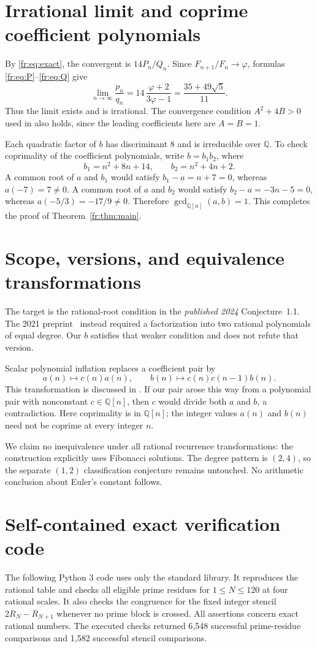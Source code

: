 \documentclass[11pt,a4paper]{article}
\newcommand{\Q}{\mathbb Q}
\theoremstyle{definition}
\theoremstyle{remark}
\numberwithin{equation}{section}
\begin{document}
\section{Irrational limit and coprime coefficient polynomials}

By \eqref{fr:eq:exact}, the convergent is $14P_n/Q_n$.
Since $F_{n+1}/F_n\to\varphi$, formulas
\eqref{fr:eq:P}--\eqref{fr:eq:Q} give
\[
 \lim_{n\to\infty}\frac{p_n}{q_n}
 =14\,\frac{\varphi+2}{3\varphi-1}
 =\frac{35+49\sqrt5}{11}.
\]
Thus the limit exists and is irrational. The convergence condition
$A^2+4B>0$ used in \cite{BND} also holds, since the leading
coefficients here are $A=B=1$.

Each quadratic factor of $b$ has discriminant $8$ and is
irreducible over $\Q$. To check coprimality of the coefficient polynomials, write
$b=b_1b_2$, where
\[
 b_1=n^2+8n+14,\qquad b_2=n^2+4n+2.
\]
A common root of $a$ and $b_1$ would satisfy
$b_1-a=n+7=0$, whereas $a(-7)=7\ne0$.
A common root of $a$ and $b_2$ would satisfy
$b_2-a=-3n-5=0$, whereas $a(-5/3)=-17/9\ne0$.
Therefore $\gcd_{\Q[n]}(a,b)=1$. This completes the proof of
Theorem~\ref{fr:thm:main}.

\section{Scope, versions, and equivalence transformations}
The target is the rational-root condition in the \emph{published 2024}
Conjecture~1.1. The 2021 preprint~\cite{BNDv1} instead required a
factorization into two rational polynomials of equal degree. Our
$b$ satisfies that weaker condition and does not refute that version.

Scalar polynomial inflation replaces a coefficient pair by
\[
 a(n)\longmapsto c(n)a(n),\qquad
 b(n)\longmapsto c(n)c(n-1)b(n).
\]
This transformation is discussed in \cite[Appendix~C]{BND}.
If our pair arose this way from a polynomial pair with nonconstant
$c\in\Q[n]$, then $c$ would divide both $a$ and $b$, a contradiction.
Here coprimality is in $\Q[n]$; the integer values $a(n)$ and $b(n)$
need not be coprime at every integer $n$.

We claim no inequivalence under all rational recurrence transformations:
the construction explicitly uses Fibonacci solutions. The degree pattern
is $(2,4)$, so the separate $(1,2)$ classification conjecture remains
untouched. No arithmetic conclusion about Euler's constant follows.



\clearpage
\appendix
\section{Self-contained exact verification code}
\label{sample:app:code}
The following Python 3 code uses only the standard library. It
reproduces the rational table and checks all eligible prime residues
for $1\le N\le120$ at four rational scales. It also checks the congruence
for the fixed integer stencil $2R_N-R_{N+1}$ whenever no prime block is
crossed. All assertions concern exact rational numbers. The executed
checks returned 6,548 successful prime-residue comparisons and 1,582
successful stencil comparisons.
\end{document}
